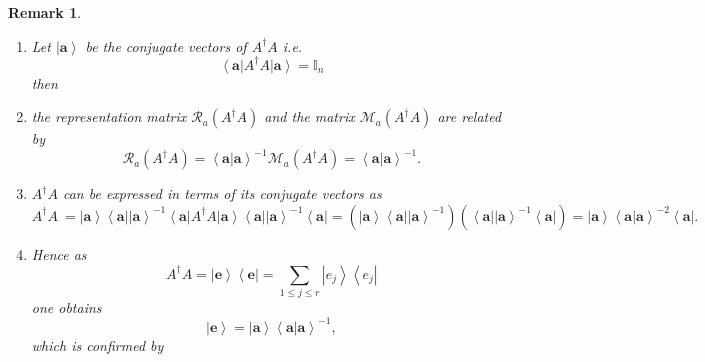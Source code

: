 \documentclass[aps,preprint]{revtex4}%
\newtheorem{remark}[theorem]{Remark}
\begin{document}
\begin{remark}
\begin{enumerate}
\begin{enumerate}
\item Let $\left\vert \mathbf{a}\right\rangle $ be the \emph{conjugate
vectors} of $A^{\dagger}A$ i.e.
\begin{equation}
\left\langle \mathbf{a}\right\vert A^{\dagger}A\left\vert \mathbf{a}%
\right\rangle =\mathbb{I}_{n}%
\end{equation}
then

\item the representation matrix $\mathcal{R}_{a}\left(  A^{\dagger}A\right)  $
and the matrix $\mathcal{M}_{a}\left(  A^{\dagger}A\right)  $ are related by
\begin{equation}
\mathcal{R}_{a}\left(  A^{\dagger}A\right)  =\left\langle \left.
\mathbf{a}\right\vert \mathbf{a}\right\rangle ^{-1}\mathcal{M}_{a}\left(
A^{\dagger}A\right)  =\left\langle \left.  \mathbf{a}\right\vert
\mathbf{a}\right\rangle ^{-1}.
\end{equation}


\item $A^{\dagger}A$ can be expressed in terms of its conjugate vectors as
\begin{equation}
A^{\dagger}A\ =\left\vert \mathbf{a}\right\rangle \left\langle \mathbf{a}%
\right\vert \left\vert \mathbf{a}\right\rangle ^{-1}\left\langle
\mathbf{a}\right\vert A^{\dagger}A\left\vert \mathbf{a}\right\rangle
\left\langle \mathbf{a}\right\vert \left\vert \mathbf{a}\right\rangle
^{-1}\left\langle \mathbf{a}\right\vert =\left(  \left\vert \mathbf{a}%
\right\rangle \left\langle \mathbf{a}\right\vert \left\vert \mathbf{a}%
\right\rangle ^{-1}\right)  \left(  \left\langle \mathbf{a}\right\vert
\left\vert \mathbf{a}\right\rangle ^{-1}\left\langle \mathbf{a}\right\vert
\right)  =\left\vert \mathbf{a}\right\rangle \left\langle \left.
\mathbf{a}\right\vert \mathbf{a}\right\rangle ^{-2}\left\langle \mathbf{a}%
\right\vert .
\end{equation}


\item Hence as
\begin{equation}
A^{\dagger}A=\left\vert \mathbf{e}\right\rangle \left\langle \mathbf{e}%
\right\vert =\sum_{1\leq j\leq r}\left\vert e_{j}\right\rangle \left\langle
e_{j}\right\vert
\end{equation}
one obtains
\begin{equation}
\left\vert \mathbf{e}\right\rangle =\left\vert \mathbf{a}\right\rangle
\left\langle \left.  \mathbf{a}\right\vert \mathbf{a}\right\rangle ^{-1},
\end{equation}
which is confirmed by


\end{enumerate}
\end{enumerate}
\end{remark}
\end{document}
